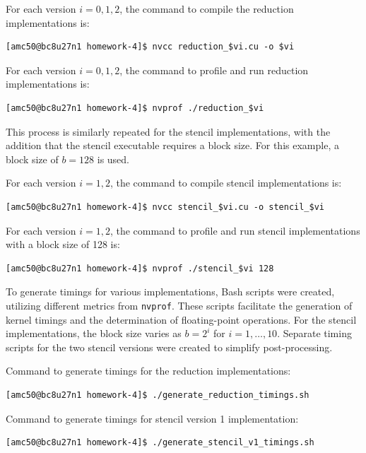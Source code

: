 \documentclass{article}
\begin{document}
\bigskip
\noindent
For each version \(i = 0, 1, 2\), the command to compile the reduction implementations is:

\begin{verbatim}
[amc50@bc8u27n1 homework-4]$ nvcc reduction_$vi.cu -o $vi
\end{verbatim}

\bigskip
\noindent
For each version \(i = 0, 1, 2\), the command to profile and run reduction implementations is:

\begin{verbatim}
[amc50@bc8u27n1 homework-4]$ nvprof ./reduction_$vi
\end{verbatim}

\bigskip
\noindent
This process is similarly repeated for the stencil implementations, with the addition that the stencil executable requires a block size. For this example, a block size of \(b = 128\) is used.

\bigskip
\noindent
For each version \(i = 1, 2\), the command to compile stencil implementations is:

\begin{verbatim}
[amc50@bc8u27n1 homework-4]$ nvcc stencil_$vi.cu -o stencil_$vi
\end{verbatim}

\bigskip
\noindent
For each version \(i = 1, 2\), the command to profile and run stencil implementations with a block size of 128 is:

\begin{verbatim}
[amc50@bc8u27n1 homework-4]$ nvprof ./stencil_$vi 128
\end{verbatim}

\bigskip
\noindent
To generate timings for various implementations, Bash scripts were created, utilizing different metrics from \texttt{nvprof}. These scripts facilitate the generation of kernel timings and the determination of floating-point operations. For the stencil implementations, the block size varies as \(b = 2^i\) for \(i = 1, \ldots, 10\). Separate timing scripts for the two stencil versions were created to simplify post-processing.

\bigskip
\noindent
Command to generate timings for the reduction implementations:
\begin{verbatim}
[amc50@bc8u27n1 homework-4]$ ./generate_reduction_timings.sh 
\end{verbatim}

\bigskip
\noindent
Command to generate timings for stencil version 1 implementation:
\begin{verbatim}
[amc50@bc8u27n1 homework-4]$ ./generate_stencil_v1_timings.sh 
\end{verbatim}
\end{document}
